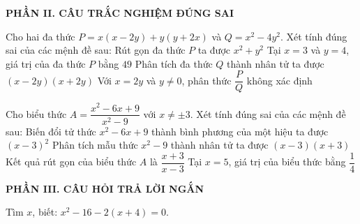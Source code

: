 \documentclass[12pt,a4paper]{article}
\begin{document}
\setcounter{ex}{0}
\noindent\textbf{\large PHẦN II. CÂU TRẮC NGHIỆM ĐÚNG SAI}
\vspace{1mm}
\begin{ex}
Cho hai đa thức $P = x(x - 2y) + y(y + 2x)$ và $Q = x^2 - 4y^2$. Xét tính đúng sai của các mệnh đề sau:
\choiceTF
{\True Rút gọn đa thức $P$ ta được $x^2 + y^2$}
{Tại $x = 3$ và $y = 4$, giá trị của đa thức $P$ bằng $49$}
{\True Phân tích đa thức $Q$ thành nhân tử ta được $(x - 2y)(x + 2y)$}
{\True Với $x = 2y$ và $y \neq 0$, phân thức $\dfrac{P}{Q}$ không xác định}
\end{ex}

\begin{ex}
Cho biểu thức $A = \dfrac{x^2 - 6x + 9}{x^2 - 9}$ với $x \neq \pm 3$. Xét tính đúng sai của các mệnh đề sau:
\choiceTF
{\True Biến đổi tử thức $x^2 - 6x + 9$ thành bình phương của một hiệu ta được $(x - 3)^2$}
{\True Phân tích mẫu thức $x^2 - 9$ thành nhân tử ta được $(x - 3)(x + 3)$}
{Kết quả rút gọn của biểu thức $A$ là $\dfrac{x + 3}{x - 3}$}
{\True Tại $x = 5$, giá trị của biểu thức bằng $\dfrac{1}{4}$}
\end{ex}


\setcounter{ex}{0}
\noindent\textbf{\large PHẦN III. CÂU HỎI TRẢ LỜI NGẮN}
\vspace{1mm}
\begin{ex}
Tìm $x$, biết: $x^2 - 16 - 2(x + 4) = 0$. 
\end{ex}
\end{document}
